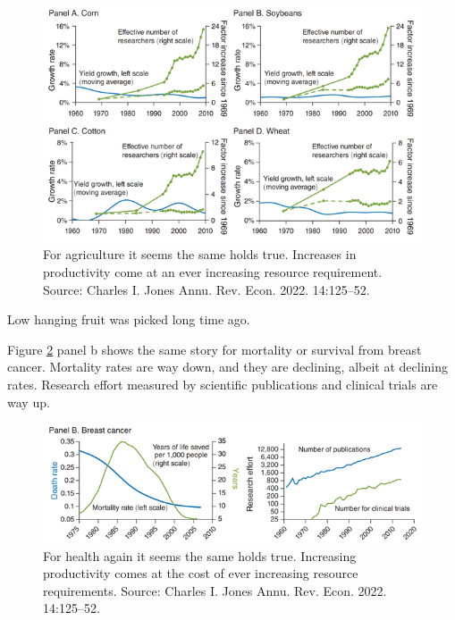 \documentclass[
]{book}
\begin{document}
\begin{figure}

{\centering \includegraphics[width=1\linewidth]{img/growth/moore17} 

}

\caption{For agriculture it seems the same holds true. Increases in productivity come at an ever increasing resource requirement. Source: Charles I. Jones Annu. Rev. Econ. 2022. 14:125–52.}\label{fig:growth17}
\end{figure}

Low hanging fruit was picked long time ago.

Figure \ref{fig:growth18} panel b shows the same story for mortality or survival from breast cancer. Mortality rates are way down, and they are declining, albeit at declining rates. Research effort measured by scientific publications and clinical trials are way up.

\begin{figure}

{\centering \includegraphics[width=1\linewidth]{img/growth/moore18} 

}

\caption{For health again it seems the same holds true. Increasing productivity comes at the cost of ever increasing resource requirements. Source: Charles I. Jones Annu. Rev. Econ. 2022. 14:125–52.}\label{fig:growth18}
\end{figure}
\end{document}
